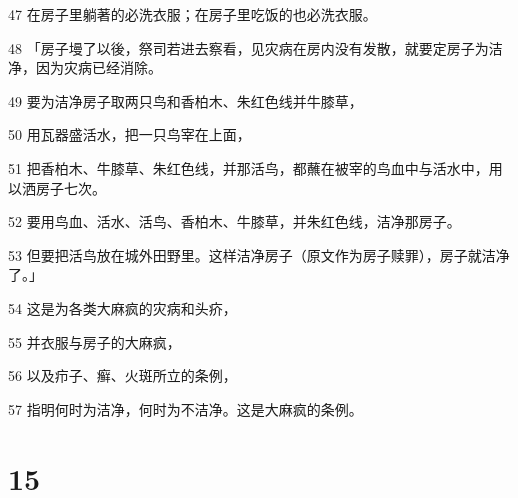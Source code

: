 \par 47 在房子里躺著的必洗衣服；在房子里吃饭的也必洗衣服。
\par 48 「房子墁了以後，祭司若进去察看，见灾病在房内没有发散，就要定房子为洁净，因为灾病已经消除。
\par 49 要为洁净房子取两只鸟和香柏木、朱红色线并牛膝草，
\par 50 用瓦器盛活水，把一只鸟宰在上面，
\par 51 把香柏木、牛膝草、朱红色线，并那活鸟，都蘸在被宰的鸟血中与活水中，用以洒房子七次。
\par 52 要用鸟血、活水、活鸟、香柏木、牛膝草，并朱红色线，洁净那房子。
\par 53 但要把活鸟放在城外田野里。这样洁净房子（原文作为房子赎罪），房子就洁净了。」
\par 54 这是为各类大麻疯的灾病和头疥，
\par 55 并衣服与房子的大麻疯，
\par 56 以及疖子、癣、火斑所立的条例，
\par 57 指明何时为洁净，何时为不洁净。这是大麻疯的条例。

\chapter{15}

